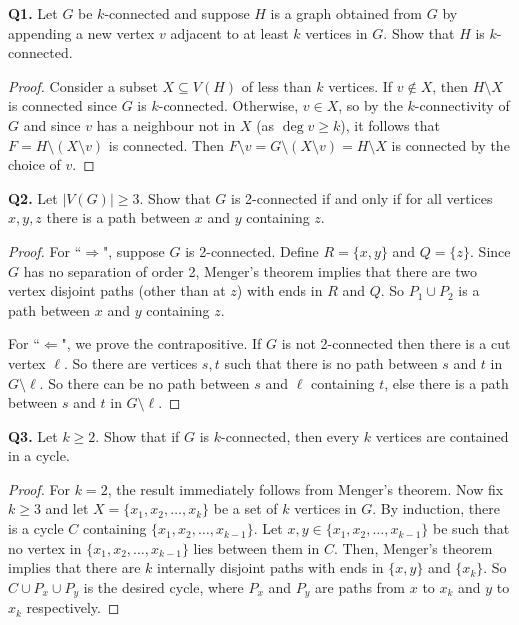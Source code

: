 \noindent \textbf{Q1.} Let $G$ be $k$-connected and suppose $H$ is a graph obtained from $G$ by appending a new vertex $v$ adjacent to at least $k$ vertices in $G$. Show that $H$ is $k$-connected.
\begin{proof}
Consider a subset $X \subseteq V(H)$ of less than \( k \) vertices. If $v \notin X$, then $H \setminus X$ is connected since $G$ is $k$-connected. Otherwise, $v \in X$, so by the $k$-connectivity of $G$ and since $v$ has a neighbour not in $X$ (as $\deg v \geq k$), it follows that $F = H \setminus (X \setminus v)$ is connected. Then $F \setminus v = G \setminus (X \setminus v) = H \setminus X $ is connected by the choice of $v$.
\end{proof}
\noindent \textbf{Q2.} Let \( |V(G)| \geq 3 \). Show that $G$ is 2-connected if and only if for all vertices $x,y,z$ there is a path between $x$ and $y$ containing $z$.
\begin{proof}
For ``$\Rightarrow$", suppose $G$ is 2-connected. Define \( R = \{ x,y \}  \) and \( Q = \{ z \}  \). Since \( G \) has no separation of order 2, Menger's theorem implies that there are two vertex disjoint paths (other than at \( z \)) with ends in \( R \) and \( Q \). So \( P_1 \cup P_2 \) is a path between \( x \) and \( y \) containing \( z \).

For ``$\Leftarrow$", we prove the contrapositive. If \( G \) is not 2-connected then there is a cut vertex \( \ell \). So there are vertices \( s,t \) such that there is no path between \( s \) and \( t \) in \( G \setminus \ell \). So there can be no path between \( s \) and \( \ell \) containing \( t \), else there is a path between \( s \) and \( t \) in \( G \setminus \ell \).
\end{proof}
\noindent \textbf{Q3.} Let \( k \geq 2 \). Show that if \( G \) is \( k \)-connected, then every \( k \) vertices are contained in a cycle.
\begin{proof}
	For \( k = 2 \), the result immediately follows from Menger's theorem. Now fix \( k \geq 3 \) and let \( X = \{ x_1, x_2, \hdots , x_{k}  \}  \) be a set of \( k \) vertices in \( G \). By induction, there is a cycle \( C \) containing \( \{ x_1, x_2, \hdots , x_{k-1}  \}  \). Let \( x, y \in \{ x_1, x_2, \hdots , x_{k-1}  \}  \) be such that no vertex in \( \{ x_1, x_2, \hdots , x_{k-1}  \}  \) lies between them in \( C \). Then, Menger's theorem implies that there are \( k \) internally disjoint paths with ends in \( \{ x, y \}  \) and \( \{ x_{k}  \}  \). So \( C \cup P_{x} \cup P_{y}   \) is  the desired cycle, where \( P_{x}  \) and \( P_{y}  \) are paths from \( x \) to \( x_{k}  \) and \( y \) to \( x_{k}  \) respectively.
\end{proof}
